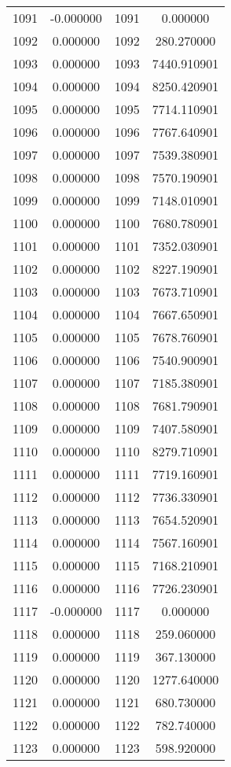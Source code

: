 \documentclass[12pt]{article}
\begin{document}
\begin{longtable}{@{}cccc@{}}
1091 & -0.000000 & 1091 & 0.000000 \\
1092 & 0.000000 & 1092 & 280.270000 \\
1093 & 0.000000 & 1093 & 7440.910901 \\
1094 & 0.000000 & 1094 & 8250.420901 \\
1095 & 0.000000 & 1095 & 7714.110901 \\
1096 & 0.000000 & 1096 & 7767.640901 \\
1097 & 0.000000 & 1097 & 7539.380901 \\
1098 & 0.000000 & 1098 & 7570.190901 \\
1099 & 0.000000 & 1099 & 7148.010901 \\
1100 & 0.000000 & 1100 & 7680.780901 \\
1101 & 0.000000 & 1101 & 7352.030901 \\
1102 & 0.000000 & 1102 & 8227.190901 \\
1103 & 0.000000 & 1103 & 7673.710901 \\
1104 & 0.000000 & 1104 & 7667.650901 \\
1105 & 0.000000 & 1105 & 7678.760901 \\
1106 & 0.000000 & 1106 & 7540.900901 \\
1107 & 0.000000 & 1107 & 7185.380901 \\
1108 & 0.000000 & 1108 & 7681.790901 \\
1109 & 0.000000 & 1109 & 7407.580901 \\
1110 & 0.000000 & 1110 & 8279.710901 \\
1111 & 0.000000 & 1111 & 7719.160901 \\
1112 & 0.000000 & 1112 & 7736.330901 \\
1113 & 0.000000 & 1113 & 7654.520901 \\
1114 & 0.000000 & 1114 & 7567.160901 \\
1115 & 0.000000 & 1115 & 7168.210901 \\
1116 & 0.000000 & 1116 & 7726.230901 \\
1117 & -0.000000 & 1117 & 0.000000 \\
1118 & 0.000000 & 1118 & 259.060000 \\
1119 & 0.000000 & 1119 & 367.130000 \\
1120 & 0.000000 & 1120 & 1277.640000 \\
1121 & 0.000000 & 1121 & 680.730000 \\
1122 & 0.000000 & 1122 & 782.740000 \\
1123 & 0.000000 & 1123 & 598.920000 \\

\end{longtable}
\end{document}
